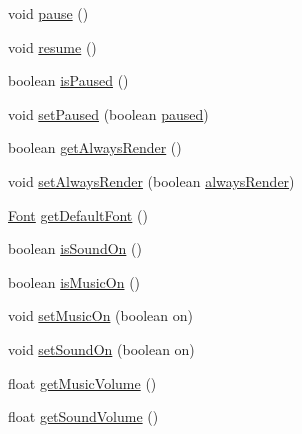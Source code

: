 \begin{DoxyCompactItemize}
\item 
void \mbox{\hyperlink{classorg_1_1newdawn_1_1slick_1_1_game_container_ac9ba130c92ce7741d0d769cf0d30677d}{pause}} ()
\item 
void \mbox{\hyperlink{classorg_1_1newdawn_1_1slick_1_1_game_container_ac0ac20b8d72db2ce4b28e2cf31a5c4c0}{resume}} ()
\item 
boolean \mbox{\hyperlink{classorg_1_1newdawn_1_1slick_1_1_game_container_a490ab225a7cb47e4ef3927cfb9549891}{is\+Paused}} ()
\item 
void \mbox{\hyperlink{classorg_1_1newdawn_1_1slick_1_1_game_container_a8f4bc4fa90e71731f9ae4a97bba85c69}{set\+Paused}} (boolean \mbox{\hyperlink{classorg_1_1newdawn_1_1slick_1_1_game_container_ae3b73023cf30def1b0b019f6e60dd022}{paused}})
\item 
boolean \mbox{\hyperlink{classorg_1_1newdawn_1_1slick_1_1_game_container_a75eb45ef137c72ed44c4758c80b49f0e}{get\+Always\+Render}} ()
\item 
void \mbox{\hyperlink{classorg_1_1newdawn_1_1slick_1_1_game_container_acd378cace457526ea0506411a3e54503}{set\+Always\+Render}} (boolean \mbox{\hyperlink{classorg_1_1newdawn_1_1slick_1_1_game_container_afc21372962046ca458a65fbd22fe4905}{always\+Render}})
\item 
\mbox{\hyperlink{interfaceorg_1_1newdawn_1_1slick_1_1_font}{Font}} \mbox{\hyperlink{classorg_1_1newdawn_1_1slick_1_1_game_container_ab1e394eedde686708f3083869b45cf5d}{get\+Default\+Font}} ()
\item 
boolean \mbox{\hyperlink{classorg_1_1newdawn_1_1slick_1_1_game_container_a186f9af4994380c155c58a6cfea6e54f}{is\+Sound\+On}} ()
\item 
boolean \mbox{\hyperlink{classorg_1_1newdawn_1_1slick_1_1_game_container_a9cdc14b8f01e7673e2eac174add41a1a}{is\+Music\+On}} ()
\item 
void \mbox{\hyperlink{classorg_1_1newdawn_1_1slick_1_1_game_container_a161bebb71ba1c82f7ae6264c6d872a0b}{set\+Music\+On}} (boolean on)
\item 
void \mbox{\hyperlink{classorg_1_1newdawn_1_1slick_1_1_game_container_aae73dc91d9a1d1542f77d70f38b7f400}{set\+Sound\+On}} (boolean on)
\item 
float \mbox{\hyperlink{classorg_1_1newdawn_1_1slick_1_1_game_container_a5cd19514224150f80b8dcec55c382d18}{get\+Music\+Volume}} ()
\item 
float \mbox{\hyperlink{classorg_1_1newdawn_1_1slick_1_1_game_container_a7c82c1b3a36e8c8fd3b2167042c2c63d}{get\+Sound\+Volume}} ()
\item 

\end{DoxyCompactItemize}
